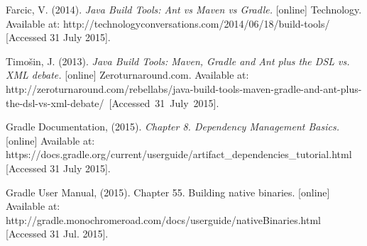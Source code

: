  Farcic, V. (2014). \textit{Java Build Tools: Ant vs Maven vs Gradle.} [online] Technology. Available at: http://technologyconversations.com/2014/06/18/build-tools/ [Accessed 31 July 2015].

 Timošin, J. (2013). \textit{Java Build Tools: Maven, Gradle and Ant plus the DSL vs. XML debate.} [online] Zeroturnaround.com. Available at: http://zeroturnaround.com/rebellabs/java-build-tools-maven-gradle-and-ant-plus-the-dsl-vs-xml-debate/~[Accessed~31~July~2015].

 Gradle Documentation, (2015). \textit{Chapter 8. Dependency Management Basics.} [online] Available at: https://docs.gradle.org/current/userguide/artifact\_dependencies\_tutorial.html [Accessed 31 July 2015].

 Gradle User Manual, (2015). Chapter 55. Building native binaries. [online] Available at: http://gradle.monochromeroad.com/docs/userguide/nativeBinaries.html [Accessed 31 Jul. 2015].